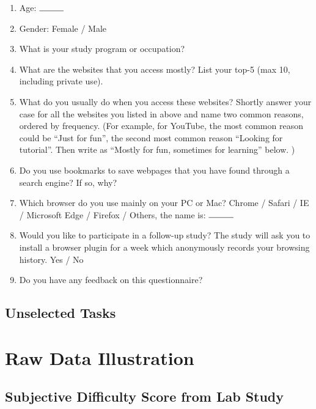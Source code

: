 \begin{enumerate}
    \item Age: $\rule{1cm}{0.15mm}$
    \item Gender: Female / Male
    \item What is your study program or occupation? 
    \item What are the websites that you access mostly? List your top-5 (max 10, including private use).
    \item What do you usually do  when you access these websites? Shortly answer your case for all the websites you listed in above and name  two common reasons, ordered by frequency.
    (For example, for YouTube, the most common reason could be ``Just for fun'', the second most common reason ``Looking for tutorial''. Then write as ``Mostly for fun, sometimes for learning'' below. )
    \item Do you use bookmarks to save webpages that you have found through a search engine? If so, why? 
    \item Which browser do you use mainly on your PC or Mac? 
          Chrome / Safari / IE / Microsoft Edge / Firefox / Others, the name is: $\rule{1cm}{0.15mm}$
    \item Would you like to participate in a follow-up study? The study will ask you to install a browser plugin for a week which anonymously records your browsing history. 
          Yes / No
    \item Do you have any feedback on this questionnaire?
\end{enumerate}

\subsection{Unselected Tasks}

\section{Raw Data Illustration}
\label{appendix:c}

\subsection{Subjective Difficulty Score from Lab Study}

